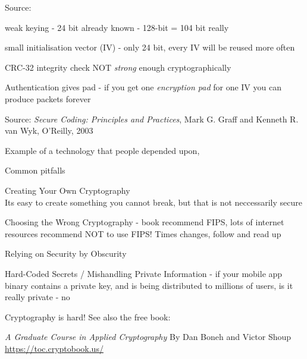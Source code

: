 \documentclass[Screen16to9,17pt]{foils}
\begin{document}
Source: 


\begin{list1}
\item weak keying - 24 bit already known - 128-bit = 104 bit really
\item small initialisation vector (IV) - only 24 bit, every IV will be reused more often
\item CRC-32 integrity check NOT \emph{strong} enough cryptographically
\item Authentication gives pad - if you get one \emph{encryption pad} for one IV you can produce packets forever
\end{list1}
Source:
\emph{Secure Coding: Principles and Practices}, Mark G. Graff
and Kenneth R. van Wyk, O'Reilly, 2003

Example of a technology that people depended upon, 



Common pitfalls
\begin{list2}
\item Creating Your Own Cryptography\\
Its easy to create something you cannot break, but that is not neccessarily secure
\item Choosing the Wrong Cryptography - book recommend FIPS, lots of internet resources recommend NOT to use FIPS! Times changes, follow and read up
\item Relying on Security by Obscurity
\item Hard-Coded Secrets / Mishandling Private Information - if your mobile app binary contains a private key, and is being distributed to millions of users, is it really private - no
\end{list2}

Cryptography is hard! See also the free book:
\begin{list1}
\item \emph{A Graduate Course in Applied Cryptography} By Dan Boneh and Victor Shoup\\
 \url{https://toc.cryptobook.us/}
\end{list1}


\end{document}
